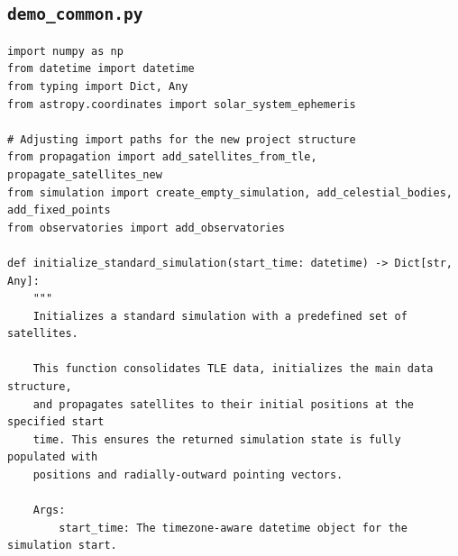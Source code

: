 \documentclass[11pt]{article}
\begin{document}
\subsection{\texttt{demo\_common.py}}
\begin{Verbatim}
import numpy as np
from datetime import datetime
from typing import Dict, Any
from astropy.coordinates import solar_system_ephemeris

# Adjusting import paths for the new project structure
from propagation import add_satellites_from_tle, propagate_satellites_new
from simulation import create_empty_simulation, add_celestial_bodies, add_fixed_points
from observatories import add_observatories

def initialize_standard_simulation(start_time: datetime) -> Dict[str, Any]:
    """
    Initializes a standard simulation with a predefined set of satellites.

    This function consolidates TLE data, initializes the main data structure,
    and propagates satellites to their initial positions at the specified start
    time. This ensures the returned simulation state is fully populated with
    positions and radially-outward pointing vectors.

    Args:
        start_time: The timezone-aware datetime object for the simulation start.


\end{Verbatim}
\end{document}

